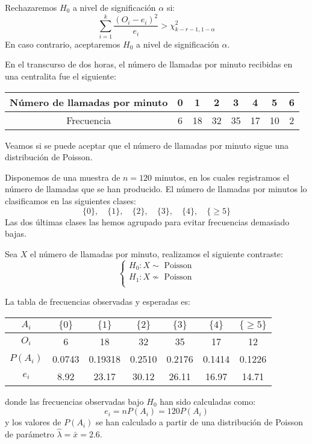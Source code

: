 Rechazaremos $H_0$ a nivel de significación $\alpha$ si:
$$\sum_{i=1}^k \frac{(O_i-e_i)^2}{e_i} > \chi^2_{k-r-1, 1-\alpha}$$
En caso contrario, aceptaremos $H_0$ a nivel de significación $\alpha$.

\begin{example}
    En el transcurso de dos horas, el número de llamadas por minuto recibidas en una centralita fue el siguiente:
    \begin{center}
        \begin{tabular}{|c | c c c c c c c |}
            \hline
            Número de llamadas por minuto & 0 & 1  & 2  & 3  & 4  & 5  & 6 \\
            \hline
            Frecuencia                    & 6 & 18 & 32 & 35 & 17 & 10 & 2 \\
            \hline
        \end{tabular}
    \end{center}
    Veamos si se puede aceptar que el número de llamadas por minuto sigue una distribución de Poisson.

    Disponemos de una muestra de $n = 120$ minutos, en los cuales registramos el número de llamadas que se han producido.
    El número de llamadas por minutos lo clasificamos en las siguientes clases:
    $$\{0\}, \quad \{1\}, \quad \{2\}, \quad \{3\}, \quad \{4\}, \quad \{\geq 5\}$$
    Las dos últimas clases las hemos agrupado para evitar frecuencias demasiado bajas.

    Sea $X$ el número de llamadas por minuto, realizamos el siguiente contraste:
    $$\begin{cases}
            H_0: X \sim \text{ Poisson}  \\
            H_1: X \nsim \text{ Poisson} \\
        \end{cases}$$

    La tabla de frecuencias observadas y esperadas es:
    \begin{center}
        \begin{tabular}{| c | c c c c c c |}
            \hline
            $A_i$    & $\{0\}$ & $\{1\}$ & $\{2\}$ & $\{3\}$ & $\{4\}$ & $\{\geq 5\}$ \\
            \hline
            $O_i$    & 6       & 18      & 32      & 35      & 17      & 12           \\
            $P(A_i)$ & 0.0743  & 0.19318 & 0.2510  & 0.2176  & 0.1414  & 0.1226       \\
            $e_i$    & 8.92    & 23.17   & 30.12   & 26.11   & 16.97   & 14.71        \\
            \hline
        \end{tabular}
    \end{center}
    donde las frecuencias observadas bajo $H_0$ han sido calculadas como:
    $$e_i = nP(A_i) = 120P(A_i)$$
    y los valores de $P(A_i)$ se han calculado a partir de una distribución de Poisson de parámetro $\hat{\lambda} = \bar{x} = 2.6$.


\end{example}
